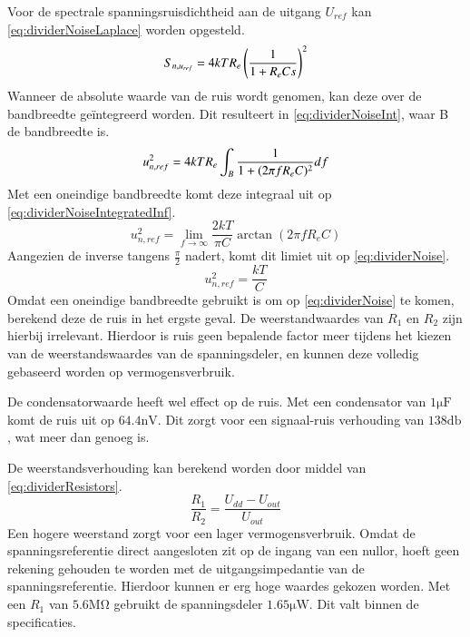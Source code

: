 \noindent
Voor de spectrale spanningsruisdichtheid aan de uitgang $U_{ref}$ kan \autoref{eq:dividerNoiseLaplace} worden opgesteld.
\begin{equation}\label{eq:dividerNoiseLaplace}
    S_{n,u_{ref}} = 4kTR_e\left(\frac{1}{1 + R_eCs}\right)^2
    \tagaddtext{[\si{\volt\squared\per\hertz}]}
\end{equation}
Wanneer de absolute waarde van de ruis wordt genomen, kan deze over de bandbreedte geïntegreerd worden. Dit resulteert in \autoref{eq:dividerNoiseInt}, waar B de bandbreedte is.
\begin{equation}\label{eq:dividerNoiseInt}
    u_{n,ref}^2 = 4kTR_e\int_{B} \frac{1}{1 + (2\pi f R_e C)^2} df
    \tagaddtext{[\si{\volt\squared}]}
\end{equation}
Met een oneindige bandbreedte komt deze integraal uit op \autoref{eq:dividerNoiseIntegratedInf}.
\begin{equation}\label{eq:dividerNoiseIntegratedInf}
    u_{n,ref}^2 = \lim_{f\rightarrow\infty}\frac{2kT}{\pi C} \arctan(2\pi f R_eC)
\end{equation}
Aangezien de inverse tangens $\frac{\pi}{2}$ nadert, komt dit limiet uit op \autoref{eq:dividerNoise}.
\begin{equation}\label{eq:dividerNoise}
    u_{n,ref}^2 = \frac{kT}{C}
\end{equation}
Omdat een oneindige bandbreedte gebruikt is om op \autoref{eq:dividerNoise} te komen, berekend deze de ruis in het ergste geval. De weerstandwaardes van $R_1$ en $R_2$ zijn hierbij irrelevant. Hierdoor is ruis geen bepalende factor meer tijdens het kiezen van de weerstandswaardes van de spanningsdeler, en kunnen deze volledig gebaseerd worden op vermogensverbruik.

De condensatorwaarde heeft wel effect op de ruis. Met een condensator van $1\si{\micro\farad}$ komt de ruis uit op $64.4\si{\nano\volt}$. Dit zorgt voor een signaal-ruis verhouding van $138\si{\decibel}$, wat meer dan genoeg is.

De weerstandsverhouding kan berekend worden door middel van \autoref{eq:dividerResistors}.
\begin{equation}\label{eq:dividerResistors}
    \frac{R_1}{R_2} = \frac{U_{dd}-U_{out}}{U_{out}}
\end{equation}
Een hogere weerstand zorgt voor een lager vermogensverbruik. Omdat de spanningsreferentie direct aangesloten zit op de ingang van een nullor, hoeft geen rekening gehouden te worden met de uitgangsimpedantie van de spanningsreferentie. Hierdoor kunnen er erg hoge waardes gekozen worden. Met een $R_1$ van $5.6\si{\mega\ohm}$ gebruikt de spanningsdeler $1.65\si{\micro\watt}$. Dit valt binnen de specificaties.

